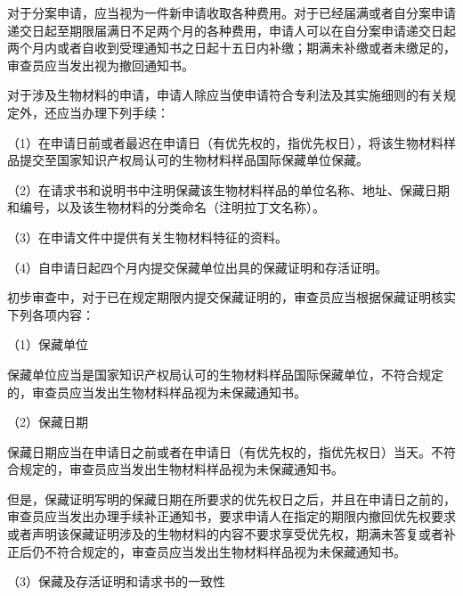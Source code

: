 对于分案申请，应当视为一件新申请收取各种费用。对于已经届满或者自分案申请递交日起至期限届满日不足两个月的各种费用，申请人可以在自分案申请递交日起两个月内或者自收到受理通知书之日起十五日内补缴；期满未补缴或者未缴足的，审查员应当发出视为撤回通知书。

对于涉及生物材料的申请，申请人除应当使申请符合专利法及其实施细则的有关规定外，还应当办理下列手续：

{\setlength{\parindent}{17.1bp}（1）在申请日前或者最迟在申请日（有优先权的，指优先权日），将该生物材料样品提交至国家知识产权局认可的生物材料样品国际保藏单位保藏。\par}

{\setlength{\parindent}{17.1bp}（2）在请求书和说明书中注明保藏该生物材料样品的单位名称、地址、保藏日期和编号，以及该生物材料的分类命名（注明拉丁文名称）。\par}

{\setlength{\parindent}{17.1bp}（3）在申请文件中提供有关生物材料特征的资料。\par}

{\setlength{\parindent}{17.1bp}（4）自申请日起四个月内提交保藏单位出具的保藏证明和存活证明。\par}

初步审查中，对于已在规定期限内提交保藏证明的，审查员应当根据保藏证明核实下列各项内容：

{\setlength{\parindent}{17.1bp}（1）保藏单位\par}

保藏单位应当是国家知识产权局认可的生物材料样品国际保藏单位，不符合规定的，审查员应当发出生物材料样品视为未保藏通知书。

{\setlength{\parindent}{17.1bp}（2）保藏日期\par}

保藏日期应当在申请日之前或者在申请日（有优先权的，指优先权日）当天。不符合规定的，审查员应当发出生物材料样品视为未保藏通知书。

但是，保藏证明写明的保藏日期在所要求的优先权日之后，并且在申请日之前的，审查员应当发出办理手续补正通知书，要求申请人在指定的期限内撤回优先权要求或者声明该保藏证明涉及的生物材料的内容不要求享受优先权，期满未答复或者补正后仍不符合规定的，审查员应当发出生物材料样品视为未保藏通知书。

{\setlength{\parindent}{17.1bp}（3）保藏及存活证明和请求书的一致性\par}

